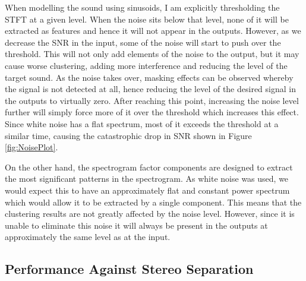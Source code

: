 \documentclass[12pt,a4paper,twoside,openright]{report}
\begin{document}

When modelling the sound using sinusoids, I am explicitly thresholding the STFT at a given level. When the noise sits below that level, none of it will be extracted as features and hence it will not appear in the outputs. However, as we decrease the SNR in the input, some of the noise will start to push over the threshold. This will not only add elements of the noise to the output, but it may cause worse clustering, adding more interference and reducing the level of the target sound. {\color{red}As the noise takes over, masking effects can be observed whereby the signal is not detected at all, hence reducing the level of the desired signal in the outputs to virtually zero.} After reaching this point, increasing the noise level further will simply force more of it over the threshold which increases this effect. Since white noise has a flat spectrum, most of it exceeds the threshold at a similar time, causing the catastrophic drop in SNR shown in Figure \ref{fig:NoisePlot}.

On the other hand, the spectrogram factor components are designed to extract the most significant patterns in the spectrogram. As white noise was used, we would expect this to have an approximately flat and constant power spectrum which would allow it to be extracted by a single component. This means that the clustering results are not greatly affected by the noise level. However, since it is unable to eliminate this noise it will always be present in the outputs at approximately the same level as at the input.

\subsection{Performance Against Stereo Separation}

\end{document}
